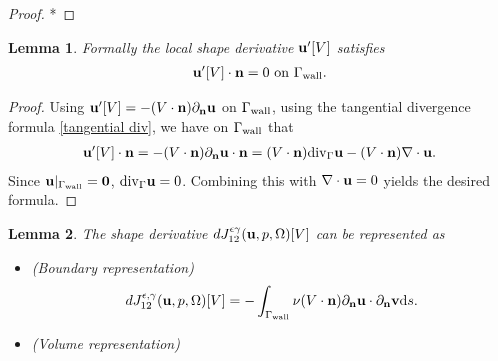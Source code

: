 \documentclass[oneside,11pt]{book}
\numberwithin{equation}{section}
\newtheorem{lemma}{Lemma}[section]
\begin{document}
\begin{proof}
    *
\end{proof}

\begin{lemma}
    \label{Kasumba_Kunisch2012 Lemma 3.2}
    Formally the local shape derivative ${\bf u}'[V]$ satisfies
    \begin{align}
        {\bf u}'[V]\cdot{\bf n} = 0 \mbox{ on } \Gamma_{\rm wall}.
    \end{align}
\end{lemma}

\begin{proof}
    Using ${\bf u}'[V] = -(V\cdot{\bf n})\partial_{\bf n}{\bf u}$ on $\Gamma_{\rm wall}$, using the tangential divergence formula \eqref{tangential div}, we have on $\Gamma_{\rm wall}$ that
    \begin{align}
        {\bf u}'[V]\cdot{\bf n} = -(V\cdot{\bf n})\partial_{\bf n}{\bf u}\cdot{\bf n} = (V\cdot{\bf n}){\rm div}_\Gamma{\bf u} - (V\cdot{\bf n})\nabla\cdot{\bf u}.
    \end{align}
    Since ${\bf u}|_{\Gamma_{\rm wall}} = {\bf 0}$, ${\rm div}_\Gamma{\bf u} = 0$. Combining this with $\nabla\cdot{\bf u} = 0$ yields the desired formula.
\end{proof}

\begin{lemma}
    The shape derivative $dJ_{12}^{\epsilon\gamma}({\bf u},p,\Omega)[V]$ can be represented as
    \begin{itemize}
        \item[(i)] (Boundary representation)
        \begin{align}
            dJ_{12}^{\epsilon,\gamma}({\bf u},p,\Omega)[V] = -\int_{\Gamma_{\rm wall}} \nu(V\cdot{\bf n})\partial_{\bf n}{\bf u}\cdot\partial_{\bf n}{\bf v}{\rm d}s.
        \end{align}
        \item[(ii)] (Volume representation)
    \end{itemize}
\end{lemma}
\end{document}
